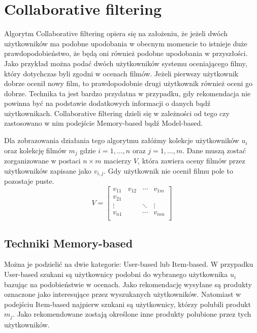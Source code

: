 \newpage

\section{Collaborative filtering}

Algorytm Collaborative filtering opiera się na założeniu, że jeżeli dwóch użytkowników ma podobne upodobania w obecnym momencie to istnieje duże prawdopodobieństwo, że będą oni również podobne upodobania w przyszłości\cite{REC01}. Jako przykład można podać dwóch użytkowników systemu oceniającego filmy, który dotychczas byli zgodni w ocenach filmów. Jeżeli pierwszy użytkownik dobrze ocenił nowy film, to prawdopodobnie drugi użytkownik również oceni go dobrze. Technika ta jest bardzo przydatna w przypadku, gdy rekomendacja nie powinna być na podstawie dodatkowych informacji o danych bądź użytkownikach. Collaborative filtering dzieli się w zależności od tego czy zastosowano w nim podejście Memory-based bądź Model-based. 

Dla zobrazowania działania tego algorytmu załóżmy kolekcje użytkowników $u_i$ oraz kolekcję filmów $m_j$ gdzie $i = 1,\dots,n$ oraz $j = 1,\dots,m$. Dane muszą zostać zorganizowane w postaci $n \times m$ macierzy $V$, która zawiera oceny filmów przez użytkowników zapisane jako $v_{i,j}$. Gdy użytkownik nie ocenił filmu pole to pozostaje puste.  
$$
V= \left[
\begin{array}{cccc}
	v_{11} & v_{12} & \cdots & v_{1m} \\
	v_{21} &   &   &   \\
	\vdots &   & \ddots  &  \vdots \\
	v_{n1} &   &  \cdots &  v_{nm}  \\
	
\end{array}
\right]
$$

\subsection{Techniki Memory-based}

Można je podzielić na dwie kategorie: User-based lub Item-based. W przypadku User-based szukani są użytkownicy podobni do wybranego użytkownika $u_i$ bazując na podobieństwie w ocenach. Jako rekomendację wysyłane są produkty oznaczone jako interesujące przez wyszukanych użytkowników. Natomiast w podejściu Item-based najpierw szukani są użytkownicy, którzy polubili produkt $m_j$. Jako rekomendowane zostają określone inne produkty polubione przez tych użytkowników.
\newline
\newline


